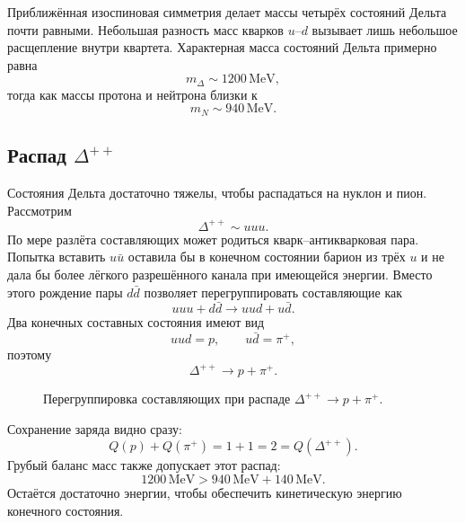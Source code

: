 Приближённая изоспиновая симметрия делает массы четырёх состояний Дельта почти равными. Небольшая разность масс кварков \(u\)--\(d\) вызывает лишь небольшое расщепление внутри квартета. Характерная масса состояний Дельта примерно равна
\begin{equation}
m_\Delta\sim1200\,\mathrm{MeV},
\end{equation}
тогда как массы протона и нейтрона близки к
\begin{equation}
m_N\sim940\,\mathrm{MeV}.
\end{equation}

\subsection{Распад \texorpdfstring{\(\Delta^{++}\)}{Delta++}}

Состояния Дельта достаточно тяжелы, чтобы распадаться на нуклон и пион. Рассмотрим
\begin{equation}
\Delta^{++}\sim uuu.
\end{equation}
По мере разлёта составляющих может родиться кварк--антикварковая пара. Попытка вставить \(u\bar u\) оставила бы в конечном состоянии барион из трёх \(u\) и не дала бы более лёгкого разрешённого канала при имеющейся энергии. Вместо этого рождение пары \(d\bar d\) позволяет перегруппировать составляющие как
\begin{equation}
uuu+d\bar d
\longrightarrow
uud+u\bar d.
\end{equation}
Два конечных составных состояния имеют вид
\begin{equation}
uud=p,
\qquad
u\bar d=\pi^+,
\end{equation}
поэтому
\begin{equation}
\Delta^{++}\longrightarrow p+\pi^+.
\end{equation}

\begin{figure}[h]
\centering
{}
\caption{Перегруппировка составляющих при распаде \(\Delta^{++}\rightarrow p+\pi^+\).}
\end{figure}

Сохранение заряда видно сразу:
\begin{equation}
Q(p)+Q(\pi^+)=1+1=2=Q(\Delta^{++}).
\end{equation}
Грубый баланс масс также допускает этот распад:
\begin{equation}
1200\,\mathrm{MeV}
>
940\,\mathrm{MeV}+140\,\mathrm{MeV}.
\end{equation}
Остаётся достаточно энергии, чтобы обеспечить кинетическую энергию конечного состояния.

